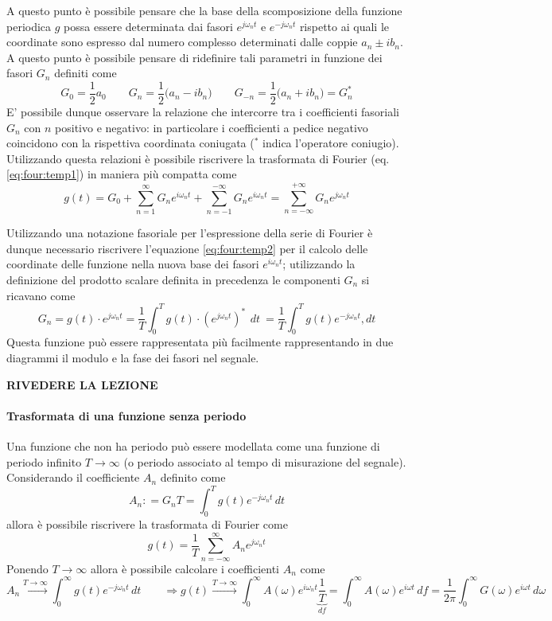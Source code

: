	A questo punto è possibile pensare che la base della scomposizione della funzione periodica $g$ possa essere determinata dai fasori $e^{j\omega_nt}$ e $e^{-j\omega_nt}$ rispetto ai quali le coordinate sono espresso dal numero complesso determinati dalle coppie $a_n \pm i b_n$. A questo punto è possibile pensare di ridefinire tali parametri in funzione dei fasori $G_n$ definiti come
	\[G_0 = \frac 1 2 a_0 \qquad G_n = \frac 1 2 \big(a_n - ib_n\big) \qquad G_{-n} = \frac 1 2 \big(a_n + ib_n\big) = G^*_n\]
	E' possibile dunque osservare la relazione che intercorre tra i coefficienti fasoriali $G_n$ con $n$ positivo e negativo: in particolare i coefficienti a pedice negativo coincidono con la rispettiva coordinata coniugata ($^*$ indica l'operatore coniugio). Utilizzando questa relazioni è possibile riscrivere la trasformata di Fourier (eq. \ref{eq:four:temp1}) in maniera più compatta come	
	\begin{equation}
	g(t) = G_0 + \sum_{n=1}^\infty G_n e^{i\omega_n t} + \sum_{n=-1}^{-\infty} G_{n} e^{i\omega_n t} =  \sum_{n=-\infty}^{+\infty} G_n e^{j\omega_n t} 
	\end{equation}
	
	Utilizzando una notazione fasoriale per l'espressione della serie di Fourier è dunque necessario riscrivere l'equazione \ref{eq:four:temp2} per il calcolo delle coordinate delle funzione nella nuova base dei fasori $e^{i\omega_n t}$; utilizzando la definizione del prodotto scalare definita in precedenza le componenti $G_n$ si ricavano come
	\[ G_n = g(t) \cdot e^{j\omega_nt}= \frac 1 T \int_0^T g(t) \cdot \left(e^{j\omega_n t} \right)^*\ \, dt\ = \frac 1 T \int_0^T g(t) e^{-j\omega_n t} , dt\]
	Questa funzione può essere rappresentata più facilmente rappresentando in due diagrammi il modulo e la fase dei fasori nel segnale.
	
	\textbf{RIVEDERE LA LEZIONE}
	
	\paragraph{Trasformata di una funzione senza periodo} Una funzione che non ha periodo può essere modellata come una funzione di periodo infinito $T\rightarrow \infty$ (o periodo associato al tempo di misurazione del segnale).
	Considerando il coefficiente $A_n$ definito come
	\[A_n : = G_n T = \int_0^T g(t) e^{-j\omega_nt}\, dt\]
	allora è possibile riscrivere la trasformata di Fourier come
	\[ g(t) = \frac 1 T \sum_{n=-\infty}^\infty A_n e^{j\omega_n t} \]
	Ponendo $T\rightarrow \infty$ allora è possibile calcolare i coefficienti $A_n$ come
	\[A_n \xrightarrow{T\rightarrow\infty} \int_0 ^\infty g(t)e ^{-j\omega_nt}\, dt \qquad \Rightarrow g(t) \xrightarrow{T\rightarrow \infty} \int_0^\infty A(\omega) e^{i\omega_n t} \underbrace{\frac 1 T}_{df} = \int_0^\infty A(\omega) e^{i\omega t}\, df = \frac 1 {2\pi}\int_0^\infty G(\omega) e^{i\omega t}\, d\omega \]
	
